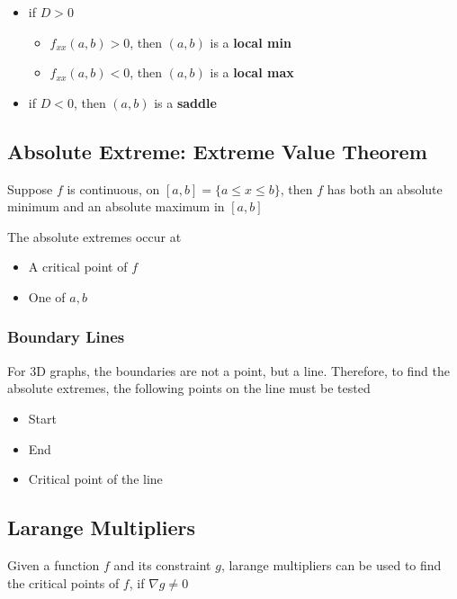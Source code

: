     \begin{itemize}
      \item if $ D > 0 $
      \begin{itemize}
        \item $ f_{xx} (a, b) > 0 $, then $ (a, b) $ is a \textbf{local min}
        \item $ f_{xx} (a, b) < 0 $, then $ (a, b) $ is a \textbf{local max}
      \end{itemize}

      \item if $ D < 0 $, then $ (a, b) $ is a \textbf{saddle}
    \end{itemize}

  \subsection{Absolute Extreme: Extreme Value Theorem}

    Suppose $ f $ is continuous, on $ \left[ a, b \right] = \{ a \le x \le b \} $,
    then $ f $ has both an absolute minimum and an absolute maximum in
    $ \left[ a, b \right] $

    The absolute extremes occur at
    \begin{itemize}
      \item A critical point of $ f $
      \item One of $ a, b $
    \end{itemize}

    \subsubsection{Boundary Lines}

      For 3D graphs, the boundaries are not a point, but a line. Therefore,
      to find the absolute extremes, the following points on the line must be
      tested
      \begin{itemize}
        \item Start
        \item End
        \item Critical point of the line
      \end{itemize}

  \subsection{Larange Multipliers}

    Given a function $ f $ and its constraint $ g $, larange multipliers can
    be used to find the critical points of $ f $, if $ \nabla g \ne 0 $

